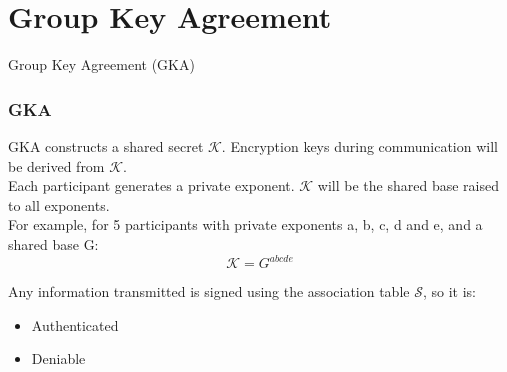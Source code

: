 \section{Group Key Agreement}

\begin{frame}
\Huge{\centerline{Group Key Agreement (GKA)}}
\end{frame}

\begin{frame}
  \frametitle{GKA}
  GKA constructs a shared secret $\mathcal{K}$. Encryption keys during communication will be derived from $\mathcal{K}$.\\[0.3cm]

  Each participant generates a private exponent.  $\mathcal{K}$ will be the shared base raised to all exponents.\\[0.3cm]

  For example, for 5 participants with private exponents a, b, c, d and e, and a shared base G:
  \[ \mathcal{K} = G^{abcde} \]

  Any information transmitted is signed using the association table $\mathcal{S}$, so it is:
  \begin{itemize}
    \item Authenticated
    \item Deniable
  \end{itemize}

\end{frame}

